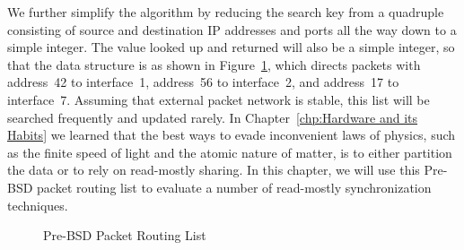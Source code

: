 We further simplify the algorithm by reducing the search key from
a quadruple consisting of source and destination IP addresses and
ports all the way down to a simple integer.
The value looked up and returned will also be a simple integer,
so that the data structure is as shown in
Figure~\ref{fig:defer:Pre-BSD Packet Routing List}, which
directs packets with address~42 to interface~1, address~56 to
interface~2, and address~17 to interface~7.
Assuming that external packet network is stable,
this list will be searched frequently and updated rarely.
In Chapter~\ref{chp:Hardware and its Habits}
we learned that the best ways to evade inconvenient laws of physics, such as
the finite speed of light and the atomic nature of matter, is to
either partition the data or to rely on read-mostly sharing.
In this chapter, we will use this Pre-BSD packet routing
list to evaluate a number of read-mostly synchronization techniques.
\fi

\begin{figure}[tb]
\begin{center}
\end{center}
\caption{Pre-BSD Packet Routing List}
\label{fig:defer:Pre-BSD Packet Routing List}
\end{figure}

